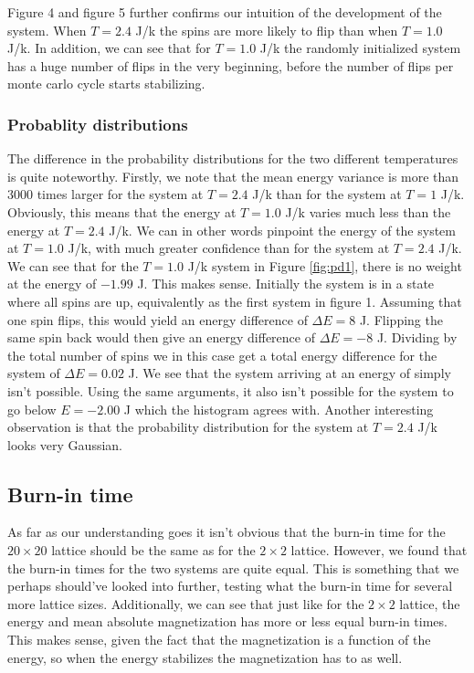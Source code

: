 \documentclass{article}
\begin{document}
\begin{multicols}{2}
Figure 4 and figure 5 further confirms our intuition of the development of the system. When $T=2.4$ J/k the spins are more likely to flip than when $T=1.0$ J/k. In addition, we can see that for $T=1.0$ J/k the randomly initialized system has a huge number of flips in the very beginning, before the number of flips per monte carlo cycle starts stabilizing. 

\subsubsection{Probablity distributions}
The difference in the probability distributions for the two different temperatures is quite noteworthy. Firstly, we note that the mean energy variance is more than 3000 times larger for the system at $T=2.4$ J/k than for the system at $T=1$ J/k. Obviously, this means that the energy at $T=1.0$ J/k varies much less than the energy at $T=2.4$ J/k. We can in other words pinpoint the energy of the system at $T=1.0$ J/k, with much greater confidence than for the system at $T=2.4$ J/k. We can see that for the $T=1.0$ J/k system in Figure \ref{fig:pd1}, there is no weight at the energy of $-1.99$ J. This makes sense. Initially the system is in a state where all spins are up, equivalently as the first system in figure 1. Assuming that one spin flips, this would yield an energy difference of $\Delta E=8$ J. Flipping the same spin back would then give an energy difference of $\Delta E=-8$ J. Dividing by the total number of spins we in this case get a total energy difference for the system of $\Delta E = 0.02$ J. We see that the system arriving at an energy of simply isn't possible. Using the same arguments, it also isn't possible for the system to go below $E=-2.00$ J which the histogram agrees with. Another interesting observation is that the probability distribution for the system at $T=2.4$ J/k looks very Gaussian. 

\subsection{Burn-in time}
As far as our understanding goes it isn't obvious that the burn-in time for the $20 \times 20$ lattice should be the same as for the $2 \times 2$ lattice. However, we found that the burn-in times for the two systems are quite equal. This is something that we perhaps should've looked into further, testing what the burn-in time for several more lattice sizes.  Additionally, we can see that just like for the $2 \times 2$ lattice, the energy and mean absolute magnetization has more or less equal burn-in times. This makes sense, given the fact that the magnetization is a function of the energy, so when the energy stabilizes the magnetization has to as well. 


\end{multicols}
\end{document}
